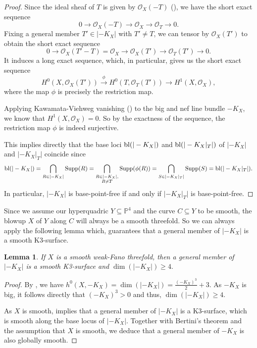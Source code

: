 \documentclass[english,11pt,reqno]{amsart}
\newcommand{\sub}{\subseteq}
\newcommand{\Pfour}{\mathbb{P}^4}
\newcommand{\bl}{\textup{bl}}
\newcommand{\supp}{\textup{Supp}}
\newtheorem{lem}[thm]{Lemma}
\begin{document}
%
\begin{proof}
Since the ideal sheaf of $T$ is given by $\mathcal{O}_X(-T)$ (\cite[Prop.\ II.6.18]{Hartshorne}), we have the short exact sequence 
$$ 0 \rightarrow \mathcal{O}_X(-T) \rightarrow \mathcal{O}_X \rightarrow \mathcal{O}_T \rightarrow 0.$$
Fixing a general member $T'\in |-K_X|$ with $T'\neq T$, we can tensor by $\mathcal{O}_X(T')$ to obtain the short exact sequence
$$ 0 \rightarrow \mathcal{O}_X(T'-T)=\mathcal{O}_X \rightarrow \mathcal{O}_X(T') \rightarrow \mathcal{O}_T(T') \rightarrow 0. $$
It induces a long exact sequence, which, in particular, gives us the short exact sequence
$$ H^0(X,\mathcal{O}_X(T'))  \overset{\phi}{\rightarrow} H^0(T,\mathcal{O}_T(T')) \rightarrow H^1(X, \mathcal{O}_X),$$ 
where the map $\phi$ is precisely the restriction map. \par 
Applying Kawamata-Viehweg vanishing (\cite[Thm.\ 4.3.1]{Lazarsfeld_positivity_in_AlgGeom_I}) to the big and nef line bundle $-K_X$, we know that $H^1(X, \mathcal{O}_X) = 0$. So by the exactness of the sequence, the restriction map $\phi$ is indeed surjective. \par 
This implies directly that the base loci $\bl(|-K_X|)$ and $\bl(|-K_X|_T|)$ of $|-K_X|$ and $|-K_X|_T|$ coincide since
$$ \bl(|-K_X|)=\bigcap_{R\in |-K_X|} \supp(R) = \bigcap_{\substack{R\in |-K_X|,\\ R\neq T}} \supp(\phi(R)) = \bigcap_{S\in |-K_X|_T|} \supp(S) =\bl(|-K_X|_T|).$$ 
In particular, $|-K_X|$ is base-point-free if and only if $|-K_X|_T|$ is base-point-free.
\end{proof}
%
%
%
Since we assume our hyperquadric $Y\sub \Pfour$ and the curve $C\sub Y$ to be smooth, the blowup $X$ of $Y$ along $C$ will always be a smooth threefold. So we can always apply the following lemma which, guarantees that a general member of $|-K_X|$ is a smooth K3-surface.
%
\begin{lem} \label{lem:weak_fano_dim_linear_system}
If $X$ is a smooth weak-Fano threefold, then a general member of $|-K_X|$ is a smooth K3-surface and 
$ \dim(|-K_X|)\geq 4.$
\end{lem}
%
\begin{proof}
By \cite[Prop.\ 1.2]{Weak_Fano_threefolds_I-Jahnke_Peternell_Radloff}, we have $h^0(X,-K_X)=\dim(|-K_X|)= \frac{(-K_X)^3}{2} +3$. As $-K_X$ is big, it follows directly that $(-K_X)^3>0$ and thus, $\dim(|-K_X|)\geq 4$.\par
As $X$ is smooth, \cite[Thm.\ 0.4 + 0.5]{Shin_3dimensional_Fano_varieties_with_canonical_singularities} implies that a general member of $ |-K_X|$ is a K3-surface, which is smooth along the base locus of $|-K_X|$. Together with Bertini's theorem and the assumption that $X$ is smooth, we deduce that a general member of $-K_X$ is also globally smooth.
\end{proof}
\end{document}
